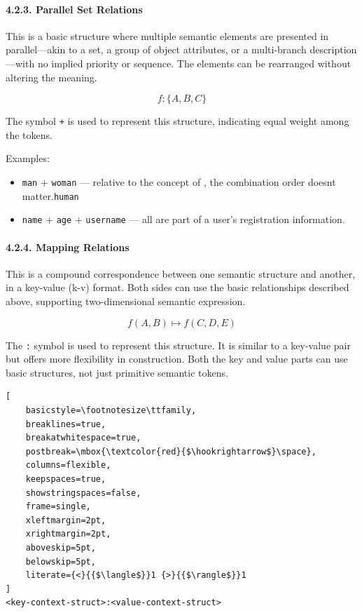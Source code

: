 \documentclass[conference]{IEEEtran}
\begin{document}
\paragraph{4.2.3. Parallel Set
Relations}\label{423-parallel-set-relations}

This is a basic structure where multiple semantic elements are presented
in parallel---akin to a set, a group of object attributes, or a
multi-branch description---with no implied priority or sequence. The
elements can be rearranged without altering the meaning.

\[f:\{A, B, C\}\]

The symbol \texttt{+} is used to represent this structure, indicating
equal weight among the tokens.

Examples:

\begin{itemize}
\item
  \texttt{man} + \texttt{woman} --- relative to the concept of , the
  combination order doesn\textquotesingle t matter.\texttt{human}
\item
  \texttt{name} + \texttt{age} + \texttt{username} --- all are part of a
  user's registration information.
\end{itemize}

\paragraph{4.2.4. Mapping Relations}\label{424-mapping-relations}

This is a compound correspondence between one semantic structure and
another, in a key-value (k-v) format. Both sides can use the basic
relationships described above, supporting two-dimensional semantic
expression.

\[ f(A, B) \mapsto f(C, D, E) \]

The \texttt{:} symbol is used to represent this structure. It is similar
to a key-value pair but offers more flexibility in construction. Both
the key and value parts can use basic structures, not just primitive
semantic tokens.

\begin{lstlisting}[
    basicstyle=\footnotesize\ttfamily,
    breaklines=true,
    breakatwhitespace=true,
    postbreak=\mbox{\textcolor{red}{$\hookrightarrow$}\space},
    columns=flexible,
    keepspaces=true,
    showstringspaces=false,
    frame=single,
    xleftmargin=2pt,
    xrightmargin=2pt,
    aboveskip=5pt,
    belowskip=5pt,
    literate={<}{{$\langle$}}1 {>}{{$\rangle$}}1
]
<key-context-struct>:<value-context-struct>
\end{lstlisting}
\end{document}
